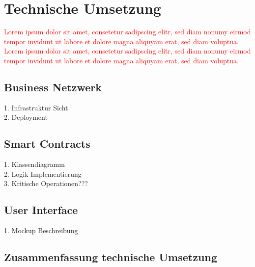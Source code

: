 \section{Technische Umsetzung}
\textcolor{red}{Lorem ipsum dolor sit amet, consetetur sadipscing elitr, sed diam nonumy eirmod tempor invidunt ut labore et dolore magna aliquyam erat, sed diam voluptua. Lorem ipsum dolor sit amet, consetetur sadipscing elitr, sed diam nonumy eirmod tempor invidunt ut labore et dolore magna aliquyam erat, sed diam voluptua.}

\subsection{Business Netzwerk}
1. Infrastruktur Sicht\\
2. Deployment

\subsection{Smart Contracts}
1. Klassendiagramm\\
2. Logik Implementierung\\
3. Kritische Operationen???

\subsection{User Interface}
1. Mockup Beschreibung

\subsection{Zusammenfassung technische Umsetzung}

\newpage
